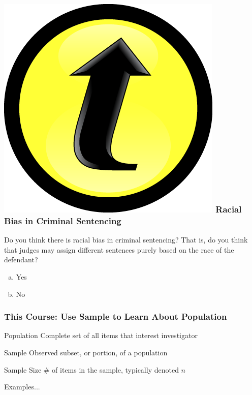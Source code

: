 \documentclass[handout]{beamer}
\begin{document}
\begin{frame}

\frametitle{\includegraphics[scale = 0.05]{./images/clicker} \hfill  Racial Bias in Criminal Sentencing}

Do you think there is racial bias in criminal sentencing? That is, do you think that judges may assign different sentences purely based on the race of the defendant?

\begin{enumerate}[(a)]
	\item Yes
	\item No
\end{enumerate}

\end{frame}



\begin{frame}
\frametitle{This Course: Use Sample to Learn About Population}


\begin{block}{Population}
Complete set of all items that interest investigator
\end{block}


\begin{block}{Sample}
Observed subset, or portion, of a population
\end{block}

\begin{block}{Sample Size}
\# of items in the sample, typically denoted $n$
\end{block}


\begin{block}{\hfill Examples...}\end{block}

\end{frame}
\end{document}
